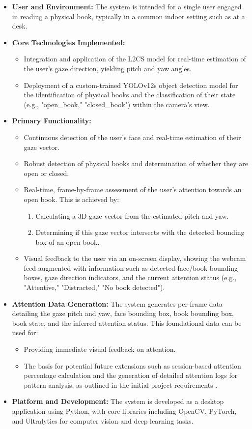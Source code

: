 \begin{itemize}
    \item \textbf{User and Environment:} The system is intended for a single user engaged in reading a physical book, typically in a common indoor setting such as at a desk.
    \item \textbf{Core Technologies Implemented:}
    \begin{itemize}
        \item Integration and application of the L2CS model for real-time estimation of the user's gaze direction, yielding pitch and yaw angles.
        \item Deployment of a custom-trained YOLOv12s object detection model for the identification of physical books and the classification of their state (e.g., "open\_book," "closed\_book") within the camera's view.
    \end{itemize}
    \item \textbf{Primary Functionality:}
    \begin{itemize}
        \item Continuous detection of the user's face and real-time estimation of their gaze vector.
        \item Robust detection of physical books and determination of whether they are open or closed.
        \item Real-time, frame-by-frame assessment of the user's attention towards an open book. This is achieved by:
            \begin{enumerate}
                \item Calculating a 3D gaze vector from the estimated pitch and yaw.
                \item Determining if this gaze vector intersects with the detected bounding box of an open book.
            \end{enumerate}
        \item Visual feedback to the user via an on-screen display, showing the webcam feed augmented with information such as detected face/book bounding boxes, gaze direction indicators, and the current attention status (e.g., "Attentive," "Distracted," "No book detected").
    \end{itemize}
    \item \textbf{Attention Data Generation:} The system generates per-frame data detailing the gaze pitch and yaw, face bounding box, book bounding box, book state, and the inferred attention status. This foundational data can be used for:
    \begin{itemize}
        \item Providing immediate visual feedback on attention.
        \item The basis for potential future extensions such as session-based attention percentage calculation and the generation of detailed attention logs for pattern analysis, as outlined in the initial project requirements .
    \end{itemize}
    \item \textbf{Platform and Development:} The system is developed as a desktop application using Python, with core libraries including OpenCV, PyTorch, and Ultralytics for computer vision and deep learning tasks.
\end{itemize}
